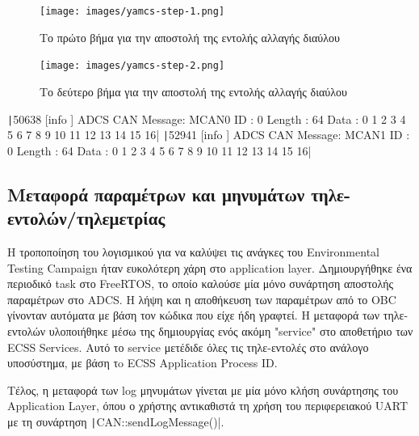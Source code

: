 \documentclass[a4paper,nobib,justified]{tufte-book}
\begin{document}
\begin{figure}
	\texttt{[image: images/yamcs-step-1.png]}
	\label{fig:yamcs-step-1}
	\caption{Το πρώτο βήμα για την αποστολή της εντολής αλλαγής διαύλου}
	\texttt{[image: images/yamcs-step-2.png]}
	\label{fig:yamcs-step-2}
	\caption{Το δεύτερο βήμα για την αποστολή της εντολής αλλαγής διαύλου}
\end{figure}

\texttt|50638 [info     ] ADCS     CAN Message: MCAN0 ID : 0 Length : 64 Data : 0 1 2 3 4 5 6 7 8 9 10 11 12 13 14 15 16|
\texttt|52941 [info     ] ADCS     CAN Message: MCAN1 ID : 0 Length : 64 Data : 0 1 2 3 4 5 6 7 8 9 10 11 12 13 14 15 16|

\subsection{Μεταφορά παραμέτρων και μηνυμάτων τηλε-εντολών/τηλεμετρίας}
Η τροποποίηση του λογισμικού για να καλύψει τις ανάγκες του Environmental Testing Campaign ήταν ευκολότερη χάρη στο application layer. Δημιουργήθηκε ένα περιοδικό task στο FreeRTOS, το οποίο καλούσε μία μόνο συνάρτηση αποστολής παραμέτρων στο ADCS. Η λήψη και η αποθήκευση των παραμέτρων από το OBC γίνονταν αυτόματα με βάση τον κώδικα που είχε ήδη γραφτεί. Η μεταφορά των τηλε-εντολών υλοποιήθηκε μέσω της δημιουργίας ενός ακόμη "service" στο αποθετήριο των ECSS Services. Αυτό το service μετέδιδε όλες τις τηλε-εντολές στο ανάλογο υποσύστημα, με βάση τo ECSS Application Process ID.

Τέλος, η μεταφορά των log μηνυμάτων γίνεται με μία μόνο κλήση συνάρτησης του Application Layer, όπου ο χρήστης αντικαθιστά τη χρήση του περιφερειακού UART με τη συνάρτηση \texttt|CAN::sendLogMessage()|.
\end{document}
